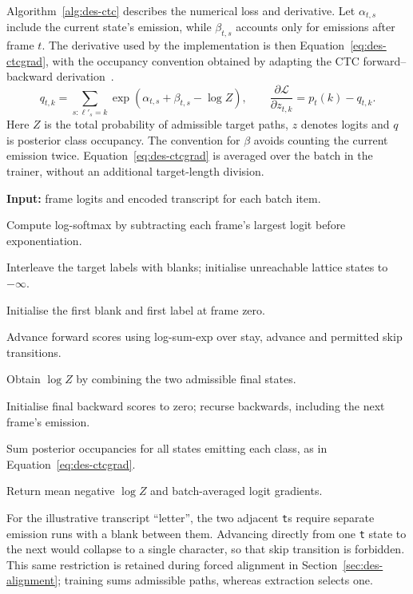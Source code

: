 Algorithm~\ref{alg:des-ctc} describes the numerical loss and derivative. Let $\alpha_{t,s}$ include the current state's emission, while $\beta_{t,s}$ accounts only for emissions after frame $t$. The derivative used by the implementation is then Equation~\ref{eq:des-ctcgrad}, with the occupancy convention obtained by adapting the CTC forward--backward derivation~\cite[PDF pp.~5--6]{graves2006}.
\begin{equation}
q_{t,k}=\sum_{s:\ell'_s=k}\exp(\alpha_{t,s}+\beta_{t,s}-\log Z),
\qquad \frac{\partial\mathcal L}{\partial z_{t,k}}=p_t(k)-q_{t,k}.
\label{eq:des-ctcgrad}
\end{equation}
Here $Z$ is the total probability of admissible target paths, $z$ denotes logits and $q$ is posterior class occupancy. The convention for $\beta$ avoids counting the current emission twice. Equation~\ref{eq:des-ctcgrad} is averaged over the batch in the trainer, without an additional target-length division.
\begin{designalgorithm}
\caption{Numerical CTC loss and logit gradient}
\label{alg:des-ctc}
\textbf{Input:} frame logits and encoded transcript for each batch item.
\begin{designsteps}
\item Compute log-softmax by subtracting each frame's largest logit before exponentiation.
\item Interleave the target labels with blanks; initialise unreachable lattice states to $-\infty$.
\item Initialise the first blank and first label at frame zero.
\item Advance forward scores using log-sum-exp over stay, advance and permitted skip transitions.
\item Obtain $\log Z$ by combining the two admissible final states.
\item Initialise final backward scores to zero; recurse backwards, including the next frame's emission.
\item Sum posterior occupancies for all states emitting each class, as in Equation~\ref{eq:des-ctcgrad}.
\item Return mean negative $\log Z$ and batch-averaged logit gradients.
\end{designsteps}
\end{designalgorithm}

For the illustrative transcript ``letter'', the two adjacent \texttt{t}s require separate emission runs with a blank between them. Advancing directly from one \texttt{t} state to the next would collapse to a single character, so that skip transition is forbidden. This same restriction is retained during forced alignment in Section~\ref{sec:des-alignment}; training sums admissible paths, whereas extraction selects one.

